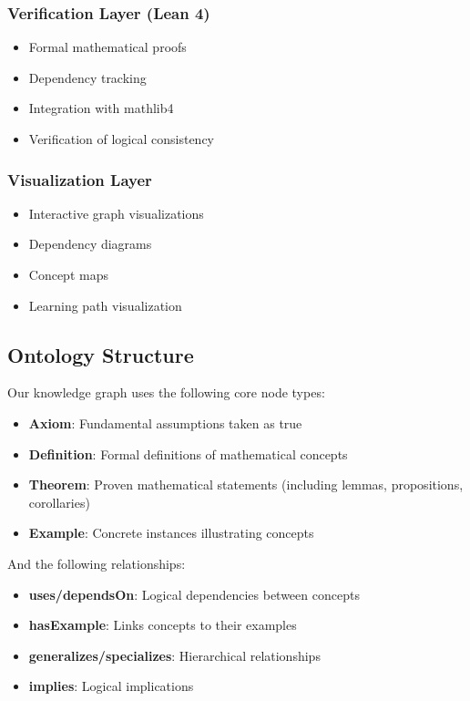 \documentclass[
  11pt,
  a4paper,
]{article}
\providecommand{\tightlist}{%
  \setlength{\itemsep}{0pt}\setlength{\parskip}{0pt}}
\begin{document}
\subsubsection{Verification Layer (Lean
4)}\label{verification-layer-lean-4}

\begin{itemize}
\tightlist
\item
  Formal mathematical proofs
\item
  Dependency tracking
\item
  Integration with mathlib4
\item
  Verification of logical consistency
\end{itemize}

\subsubsection{Visualization Layer}\label{visualization-layer}

\begin{itemize}
\tightlist
\item
  Interactive graph visualizations
\item
  Dependency diagrams
\item
  Concept maps
\item
  Learning path visualization
\end{itemize}

\subsection{Ontology Structure}\label{ontology-structure}

Our knowledge graph uses the following core node types:

\begin{itemize}
\tightlist
\item
  \textbf{Axiom}: Fundamental assumptions taken as true
\item
  \textbf{Definition}: Formal definitions of mathematical concepts
\item
  \textbf{Theorem}: Proven mathematical statements (including lemmas,
  propositions, corollaries)
\item
  \textbf{Example}: Concrete instances illustrating concepts
\end{itemize}

And the following relationships:

\begin{itemize}
\tightlist
\item
  \textbf{uses/dependsOn}: Logical dependencies between concepts
\item
  \textbf{hasExample}: Links concepts to their examples
\item
  \textbf{generalizes/specializes}: Hierarchical relationships
\item
  \textbf{implies}: Logical implications
\end{itemize}
\end{document}
